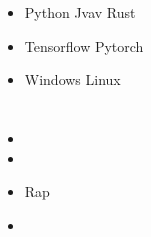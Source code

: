 \documentclass{article}
\begin{document}
    \begin{minipage}[t]{0.6\textwidth}
        \section[ ]{\makebox[\iconwidth][c]{\color{primary_color}{\faWrench}}\quad  }
        \begin{itemize}
        \setlength{\itemsep}{0.5em}
            \item   Python Jvav Rust  
            \item   Tensorflow Pytorch  
            \item   Windows   Linux  
        \end{itemize}
    \end{minipage}
    \hfill
    \begin{minipage}[t]{0.35\textwidth}
        \section[ ]{\makebox[\iconwidth][c]{\color{primary_color}{\faStar}}\quad  }
        \begin{itemize}
        \setlength{\itemsep}{0.5em}
            \item  
            \item  
            \item Rap
            \item  
        \end{itemize}
    \end{minipage}
    

\end{document}

